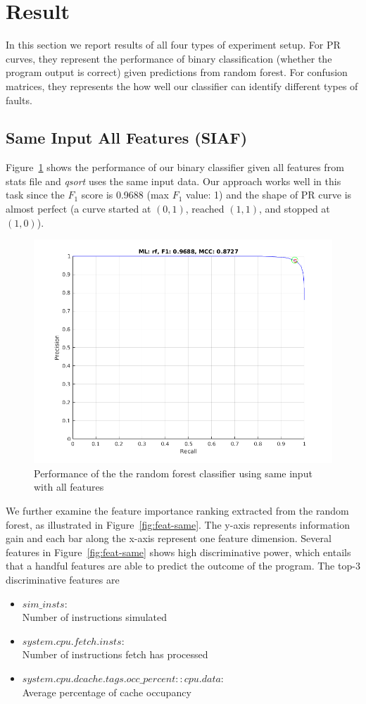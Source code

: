 \section{Result}
In this section we report results of all four types of experiment setup. For PR curves, they represent the performance of binary classification (whether the program output is correct) given predictions from random forest. For confusion matrices, they represents the how well our classifier can identify different types of faults.

\subsection{Same Input All Features (SIAF)}
Figure~\ref{fig:siaf} shows the performance of our binary classifier given all features from stats file and \emph{qsort} uses the same input data. Our approach works well in this task since the $F_1$ score is 0.9688 (max $F_1$ value: 1) and the shape of PR curve is almost perfect (a curve started at $(0,1)$, reached $(1,1)$, and stopped at $(1,0)$). 

\begin{figure}[ht]
\begin{center}
   \includegraphics[width=0.8\linewidth]{./figures/siaf.png}
\end{center}
   \caption{Performance of the the random forest classifier using same input with all features}
\label{fig:siaf}
\end{figure}

We further examine the feature importance ranking extracted from the random forest, as illustrated in Figure~\ref{fig:feat-same}. The y-axis represents information gain and each bar along the x-axis represent one feature dimension. Several features in Figure~\ref{fig:feat-same} shows high discriminative power, which entails that a handful features are able to predict the outcome of the program. The top-3 discriminative features are 
\begin{itemize}
\item $sim\_insts$: \\
Number of instructions simulated
\item $system.cpu.fetch.insts$: \\
Number of instructions fetch has processed
\item $system.cpu.dcache.tags.occ\_percent::cpu.data$: \\
Average percentage of cache occupancy
\end{itemize}


